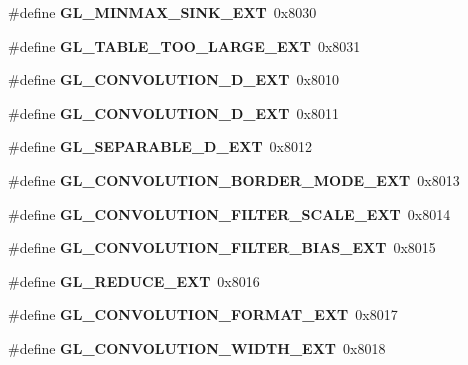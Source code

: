 \begin{DoxyCompactItemize}
\item 
\#define {\bfseries G\+L\+\_\+\+M\+I\+N\+M\+A\+X\+\_\+\+S\+I\+N\+K\+\_\+\+E\+X\+T}~0x8030\label{_s_d_l__opengl_8h_a070887c9a4519be4408ad185a3f84d6a}

\item 
\#define {\bfseries G\+L\+\_\+\+T\+A\+B\+L\+E\+\_\+\+T\+O\+O\+\_\+\+L\+A\+R\+G\+E\+\_\+\+E\+X\+T}~0x8031\label{_s_d_l__opengl_8h_a38c4e29784649f08ced7a8f6605645a4}

\item 
\#define {\bfseries G\+L\+\_\+\+C\+O\+N\+V\+O\+L\+U\+T\+I\+O\+N\+\_\+D\+\_\+\+E\+X\+T}~0x8010\label{_s_d_l__opengl_8h_a1831a92309a1b7dc718e0118e6fce4f4}

\item 
\#define {\bfseries G\+L\+\_\+\+C\+O\+N\+V\+O\+L\+U\+T\+I\+O\+N\+\_\+D\+\_\+\+E\+X\+T}~0x8011\label{_s_d_l__opengl_8h_a025de61ff93f5e5cd93edf66509fd74f}

\item 
\#define {\bfseries G\+L\+\_\+\+S\+E\+P\+A\+R\+A\+B\+L\+E\+\_\+D\+\_\+\+E\+X\+T}~0x8012\label{_s_d_l__opengl_8h_a435dd55b0629d8a491970f987231abe1}

\item 
\#define {\bfseries G\+L\+\_\+\+C\+O\+N\+V\+O\+L\+U\+T\+I\+O\+N\+\_\+\+B\+O\+R\+D\+E\+R\+\_\+\+M\+O\+D\+E\+\_\+\+E\+X\+T}~0x8013\label{_s_d_l__opengl_8h_a296eeaae35cc5502f588c0cb29831b20}

\item 
\#define {\bfseries G\+L\+\_\+\+C\+O\+N\+V\+O\+L\+U\+T\+I\+O\+N\+\_\+\+F\+I\+L\+T\+E\+R\+\_\+\+S\+C\+A\+L\+E\+\_\+\+E\+X\+T}~0x8014\label{_s_d_l__opengl_8h_a467ee88e8fd48327d8216589e88803fb}

\item 
\#define {\bfseries G\+L\+\_\+\+C\+O\+N\+V\+O\+L\+U\+T\+I\+O\+N\+\_\+\+F\+I\+L\+T\+E\+R\+\_\+\+B\+I\+A\+S\+\_\+\+E\+X\+T}~0x8015\label{_s_d_l__opengl_8h_adeeba35f270133716adee4de6505458c}

\item 
\#define {\bfseries G\+L\+\_\+\+R\+E\+D\+U\+C\+E\+\_\+\+E\+X\+T}~0x8016\label{_s_d_l__opengl_8h_a4101fa51db9ed1f3980f40d7be7563b2}

\item 
\#define {\bfseries G\+L\+\_\+\+C\+O\+N\+V\+O\+L\+U\+T\+I\+O\+N\+\_\+\+F\+O\+R\+M\+A\+T\+\_\+\+E\+X\+T}~0x8017\label{_s_d_l__opengl_8h_a40991780c33f434e075092e2705d4133}

\item 
\#define {\bfseries G\+L\+\_\+\+C\+O\+N\+V\+O\+L\+U\+T\+I\+O\+N\+\_\+\+W\+I\+D\+T\+H\+\_\+\+E\+X\+T}~0x8018\label{_s_d_l__opengl_8h_a30a25289aa610ca37ad5fad5534211ef}


\end{DoxyCompactItemize}
